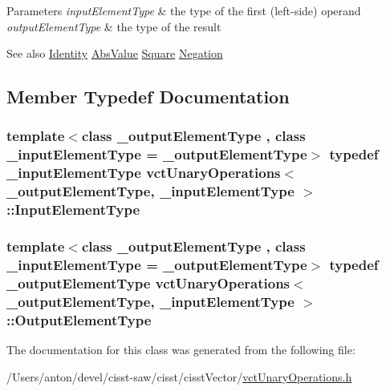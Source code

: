 \begin{DoxyParams}{Parameters}
{\em input\+Element\+Type} & the type of the first (left-\/side) operand \\
\hline
{\em output\+Element\+Type} & the type of the result\\
\hline
\end{DoxyParams}
\begin{DoxySeeAlso}{See also}
\hyperlink{classvct_unary_operations_1_1_identity}{Identity} \hyperlink{classvct_unary_operations_1_1_abs_value}{Abs\+Value} \hyperlink{classvct_unary_operations_1_1_square}{Square} \hyperlink{classvct_unary_operations_1_1_negation}{Negation} 
\end{DoxySeeAlso}


\subsection{Member Typedef Documentation}
\hypertarget{classvct_unary_operations_abf3b77bb7b8abd7ba72a6a45a65696a7}{}
\subsubsection[{Input\+Element\+Type}]{\setlength{\rightskip}{0pt plus 5cm}template$<$class \+\_\+output\+Element\+Type , class \+\_\+input\+Element\+Type  = \+\_\+output\+Element\+Type$>$ typedef \+\_\+input\+Element\+Type {\bf vct\+Unary\+Operations}$<$ \+\_\+output\+Element\+Type, \+\_\+input\+Element\+Type $>$\+::{\bf Input\+Element\+Type}}\label{classvct_unary_operations_abf3b77bb7b8abd7ba72a6a45a65696a7}
\hypertarget{classvct_unary_operations_a42306ac3dd20d32c6d6c66ac3fa2e7b9}{}
\subsubsection[{Output\+Element\+Type}]{\setlength{\rightskip}{0pt plus 5cm}template$<$class \+\_\+output\+Element\+Type , class \+\_\+input\+Element\+Type  = \+\_\+output\+Element\+Type$>$ typedef \+\_\+output\+Element\+Type {\bf vct\+Unary\+Operations}$<$ \+\_\+output\+Element\+Type, \+\_\+input\+Element\+Type $>$\+::{\bf Output\+Element\+Type}}\label{classvct_unary_operations_a42306ac3dd20d32c6d6c66ac3fa2e7b9}


The documentation for this class was generated from the following file\+:\begin{DoxyCompactItemize}
\item 
/\+Users/anton/devel/cisst-\/saw/cisst/cisst\+Vector/\hyperlink{vct_unary_operations_8h}{vct\+Unary\+Operations.\+h}\end{DoxyCompactItemize}

